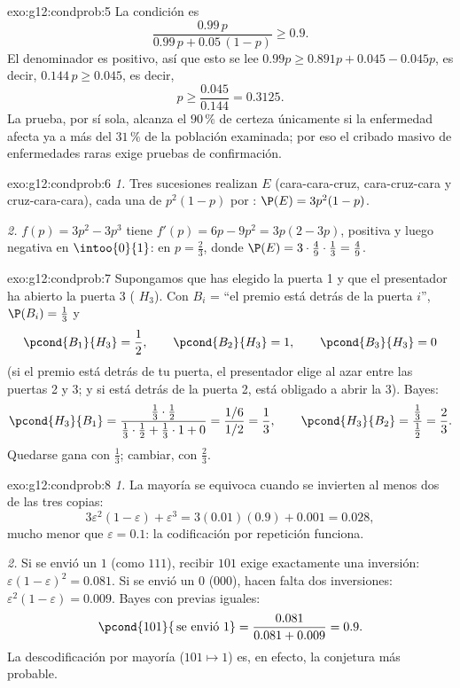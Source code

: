 \begin{solution}{exo:g12:condprob:5}
La condición es
\[
\frac{0.99\,p}{0.99\,p + 0.05\,(1-p)} \geq 0.9 .
\]
El denominador es positivo, así que esto se lee
$0.99p \geq 0.891p + 0.045 - 0.045p$, es decir,
$0.144\,p \geq 0.045$, es decir,
\[
p \geq \frac{0.045}{0.144} = 0.3125 .
\]
La prueba, por sí sola, alcanza el $90\,\%$ de certeza únicamente si la
enfermedad afecta ya a más del $31\,\%$ de la población examinada; por eso
el cribado masivo de enfermedades raras exige pruebas de confirmación.
\end{solution}

\begin{solution}{exo:g12:condprob:6}
\emph{1.} Tres sucesiones realizan $E$ (cara-cara-cruz, cara-cruz-cara y
cruz-cara-cara), cada una de  $p^2(1-p)$ por :
$\P(E) = 3p^2(1 - p)$.

\emph{2.} $f(p) = 3p^2 - 3p^3$ tiene $f'(p) = 6p - 9p^2 = 3p(2 - 3p)$,
positiva y luego negativa en $\intoo{0}{1}$:  en $p = \frac23$, donde
$\P(E) = 3\cdot\frac49\cdot\frac13 = \frac49$.
\end{solution}

\begin{solution}{exo:g12:condprob:7}
Supongamos que has elegido la puerta 1 y que el presentador ha abierto la
puerta 3 ( $H_3$). Con $B_i$ = ``el premio está detrás de la puerta
$i$'', $\P(B_i) = \frac13$ y
\[
\pcond{B_1}{H_3} = \frac12, \qquad
\pcond{B_2}{H_3} = 1, \qquad
\pcond{B_3}{H_3} = 0
\]
(si el premio está detrás de tu puerta, el presentador elige al azar entre
las puertas 2 y 3; y si está detrás de la puerta 2, está obligado a abrir
la 3). Bayes:
\[
\pcond{H_3}{B_1}
= \frac{\frac13\cdot\frac12}{\frac13\cdot\frac12 + \frac13\cdot1 + 0}
= \frac{1/6}{1/2} = \frac13,
\qquad
\pcond{H_3}{B_2} = \frac{\frac13}{\frac12} = \frac23 .
\]
Quedarse gana con  $\frac13$; cambiar, con 
$\frac23$.
\end{solution}

\begin{solution}{exo:g12:condprob:8}
\emph{1.} La mayoría se equivoca cuando se invierten al menos dos de las
tres copias:
\[
3\varepsilon^2(1-\varepsilon) + \varepsilon^3
= 3(0.01)(0.9) + 0.001 = 0.028,
\]
mucho menor que $\varepsilon = 0.1$: la codificación por repetición
funciona.

\emph{2.} Si se envió un $1$ (como $111$), recibir $101$ exige exactamente
una inversión:  $\varepsilon(1-\varepsilon)^2 = 0.081$. Si se
envió un $0$ ($000$), hacen falta dos inversiones:
$\varepsilon^2(1-\varepsilon) = 0.009$. Bayes con  previas
iguales:
\[
\pcond{101}{\,\text{se envió }1} = \frac{0.081}{0.081 + 0.009} = 0.9 .
\]
La descodificación por mayoría ($101 \mapsto 1$) es, en efecto, la
conjetura más probable.
\end{solution}

